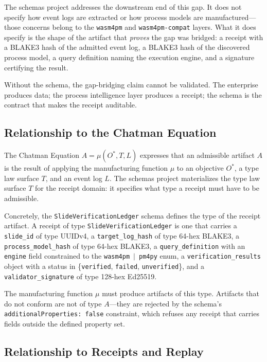 The schemas project addresses the downstream end of this gap. It does not specify how event logs
are extracted or how process models are manufactured---those concerns belong to the \texttt{wasm4pm}
and \texttt{wasm4pm-compat} layers. What it does specify is the shape of the artifact that
\emph{proves} the gap was bridged: a receipt with a BLAKE3 hash of the admitted event log, a
BLAKE3 hash of the discovered process model, a query definition naming the execution engine, and
a signature certifying the result.

Without the schema, the gap-bridging claim cannot be validated. The enterprise produces data;
the process intelligence layer produces a receipt; the schema is the contract that makes the
receipt auditable.

\subsection{Relationship to the Chatman Equation}
\label{sec:schemas-lineage-chatman-equation}

The Chatman Equation $A = \mu(O^*, T, L)$ expresses that an admissible artifact $A$ is the
result of applying the manufacturing function $\mu$ to an objective $O^*$, a type law surface $T$,
and an event log $L$. The schemas project materializes the type law surface $T$ for the receipt
domain: it specifies what type a receipt must have to be admissible.

Concretely, the \texttt{SlideVerificationLedger} schema defines the type of the receipt artifact.
A receipt of type \texttt{SlideVerificationLedger} is one that carries a \texttt{slide\_id} of
type UUIDv4, a \texttt{target\_log\_hash} of type 64-hex BLAKE3, a \texttt{process\_model\_hash}
of type 64-hex BLAKE3, a \texttt{query\_definition} with an \texttt{engine} field constrained to
the \texttt{wasm4pm}~$|$~\texttt{pm4py} enum, a \texttt{verification\_results} object with a
status in \{\texttt{verified}, \texttt{failed}, \texttt{unverified}\}, and a
\texttt{validator\_signature} of type 128-hex Ed25519.

The manufacturing function $\mu$ must produce artifacts of this type. Artifacts that do not
conform are not of type $A$---they are rejected by the schema's \texttt{additionalProperties: false}
constraint, which refuses any receipt that carries fields outside the defined property set.

\subsection{Relationship to Receipts and Replay}
\label{sec:schemas-lineage-receipts-replay}

